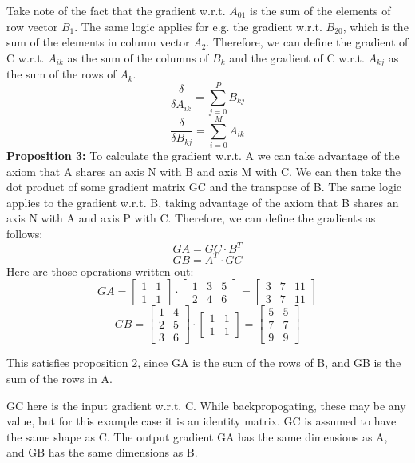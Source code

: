 \documentclass{report}
\begin{document}
            Take note of the fact that the gradient w.r.t. $A_{01}$ is the sum of the elements of row vector $B_1$. The same logic applies for e.g. the gradient 
            w.r.t. $B_{20}$, which is the sum of 
            the elements in column vector $A_2$. Therefore, we can define the gradient of C w.r.t. $A_{ik}$ as the sum of the columns of $B_k$ and the gradient 
            of C w.r.t. $A_{kj}$ as the sum of the rows of $A_k$. 
            $$\frac{\delta}{\delta{A_{ik}}} = \sum_{j=0}^{P} B_{kj}$$
            $$\frac{\delta}{\delta{B_{kj}}} = \sum_{i=0}^{M} A_{ik}$$
            \textbf{Proposition 3:}
            To calculate the gradient w.r.t. A we can take advantage of the axiom that A shares an axis N with B and axis M with C.  
            We can then take the dot product of some gradient matrix GC and the transpose of B. The same logic applies to the gradient w.r.t. B, 
            taking advantage of the axiom that B shares an axis N with A and axis P with C. Therefore, we can define the gradients as follows:
            $$GA = GC \cdot B^T$$ 
            $$GB = A^T \cdot GC$$
            Here are those operations written out: 
            $$GA = \begin{bmatrix} 1 & 1 \\ 1 & 1\end{bmatrix} \cdot \begin{bmatrix}1 & 3 & 5 \\ 2 & 4 & 6 \end{bmatrix} = \begin{bmatrix}3 & 7 & 11 \\ 3 & 7 & 11 \end{bmatrix}$$
            $$GB = \begin{bmatrix} 1 & 4 \\ 2 & 5 \\ 3 & 6 \end{bmatrix} \cdot \begin{bmatrix} 1 & 1 \\ 1 & 1 \end{bmatrix} = \begin{bmatrix}5 & 5 \\ 7 & 7 \\ 9 & 9 \end{bmatrix}$$

            This satisfies proposition 2, since GA is the sum of the rows of B, and GB is the sum of the rows in A. 

            GC here is the input gradient w.r.t. C. While backpropogating, these may be any value, but for this example case it is an identity matrix. GC is assumed to 
            have the same shape as C.  
            The output gradient GA has the same dimensions as A, and GB has the same dimensions as B. 
\end{document}
